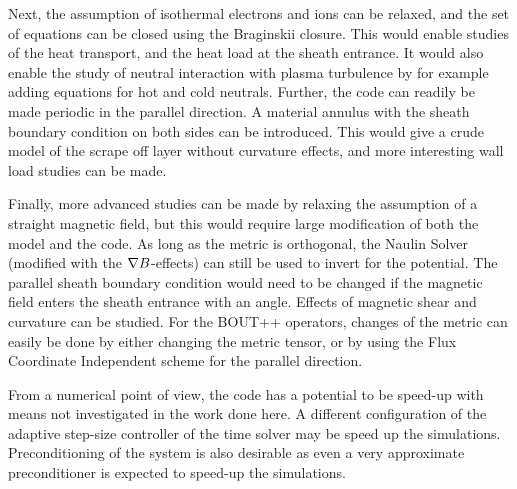 Next, the assumption of isothermal electrons and ions can be relaxed, and the set of equations can be closed using the Braginskii closure.
This would enable studies of the heat transport, and the heat load at the sheath entrance.
It would also enable the study of neutral interaction with plasma turbulence by for example adding equations for hot and cold neutrals.
Further, the code can readily be made periodic in the parallel direction.
A material annulus with the sheath boundary condition on both sides can be introduced.
This would give a crude model of the scrape off layer without curvature effects, and more interesting wall load studies can be made.

Finally, more advanced studies can be made by relaxing the assumption of a straight magnetic field, but this would require large modification of both the model and the code.
As long as the metric is orthogonal, the Naulin Solver (modified with the $\nabla B$-effects) can still be used to invert for the potential.
The parallel sheath boundary condition would need to be changed if the magnetic field enters the sheath entrance with an angle.
Effects of magnetic shear and curvature can be studied.
For the BOUT++ operators, changes of the metric can easily be done by either changing the metric tensor, or by using the Flux Coordinate Independent scheme for the parallel direction.

From a numerical point of view, the code has a potential to be speed-up with means not investigated in the work done here.
A different configuration of the adaptive step-size controller of the time solver may be speed up the simulations.
Preconditioning of the system is also desirable as even a very approximate preconditioner is expected to speed-up the simulations.
